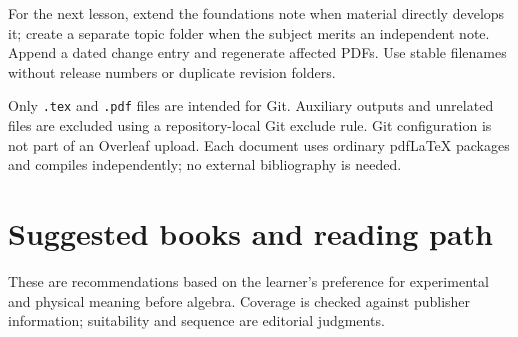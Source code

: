 \documentclass[11pt,letterpaper]{article}
\begin{document}
For the next lesson, extend the foundations note when material directly develops it; create a separate topic folder when the subject merits an independent note. Append a dated change entry and regenerate affected PDFs. Use stable filenames without release numbers or duplicate revision folders.

Only \texttt{.tex} and \texttt{.pdf} files are intended for Git. Auxiliary outputs and unrelated files are excluded using a repository-local Git exclude rule. Git configuration is not part of an Overleaf upload. Each document uses ordinary pdfLaTeX packages and compiles independently; no external bibliography is needed.

\newpage
\section*{Suggested books and reading path}
These are recommendations based on the learner's preference for experimental and physical meaning before algebra. Coverage is checked against publisher information; suitability and sequence are editorial judgments.
\end{document}
